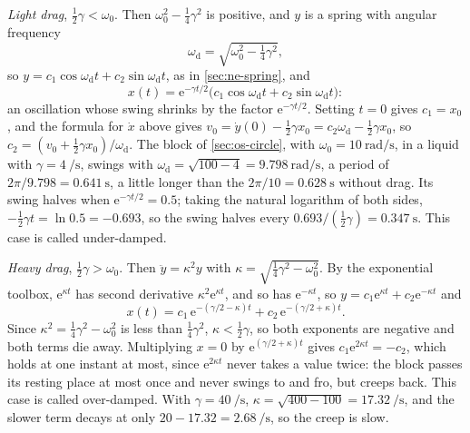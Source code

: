 \emph{Light drag}, $\frac12\gamma < \omega_0$. Then $\omega_0^2 -
\frac14\gamma^2$ is positive, and $y$ is a spring with angular frequency
\begin{equation*}
   \omega_{\mathrm d} = \sqrt{\omega_0^2 - \tfrac14\gamma^2} ,
\end{equation*}
so $y = c_1\cos\omega_{\mathrm d}t + c_2\sin\omega_{\mathrm d}t$, as in
\cref{sec:ne-spring}, and
\begin{equation*}
   x(t) = \mathrm{e}^{-\gamma t/2}\bigl(c_1\cos\omega_{\mathrm d}t
   + c_2\sin\omega_{\mathrm d}t\bigr) :
\end{equation*}
an oscillation whose swing shrinks by the factor $\mathrm{e}^{-\gamma
t/2}$. Setting $t = 0$ gives $c_1 = x_0$, and the formula for $\dot{x}$
above gives $v_0 = \dot{y}(0) - \frac12\gamma x_0 = c_2\omega_{\mathrm d} -
\frac12\gamma x_0$, so $c_2 = (v_0 + \frac12\gamma x_0)/\omega_{\mathrm d}$.
The block of \cref{sec:os-circle}, with $\omega_0 =
\SI{10}{\radian\per\second}$, in a liquid with $\gamma =
\SI{4}{\per\second}$, swings with $\omega_{\mathrm d} = \sqrt{100 - 4} =
\SI{9.798}{\radian\per\second}$, a period of $2\pi/9.798 =
\SI{0.641}{\second}$, a little longer than the $2\pi/10 =
\SI{0.628}{\second}$ without drag. Its swing halves when $\mathrm{e}^{
-\gamma t/2} = 0.5$; taking the natural logarithm of both sides,
$-\frac12\gamma t = \ln 0.5 = -0.693$, so the swing halves every
$0.693/(\frac12\gamma) = \SI{0.347}{\second}$. This case is called under-damped.

\emph{Heavy drag}, $\frac12\gamma > \omega_0$. Then $\ddot{y} = \kappa^2
y$ with $\kappa = \sqrt{\frac14\gamma^2 - \omega_0^2}$. By the exponential
toolbox, $\mathrm{e}^{\kappa t}$ has second derivative $\kappa^2\mathrm{e}^{
\kappa t}$, and so has $\mathrm{e}^{-\kappa t}$, so $y = c_1\mathrm{e}^{
\kappa t} + c_2\mathrm{e}^{-\kappa t}$ and
\begin{equation*}
   x(t) = c_1\,\mathrm{e}^{-(\gamma/2 - \kappa)t}
   + c_2\,\mathrm{e}^{-(\gamma/2 + \kappa)t} .
\end{equation*}
Since $\kappa^2 = \frac14\gamma^2 - \omega_0^2$ is less than
$\frac14\gamma^2$, $\kappa < \frac12\gamma$, so both exponents are
negative and both terms die away. Multiplying $x = 0$ by $\mathrm{e}^{
(\gamma/2 + \kappa)t}$ gives $c_1\mathrm{e}^{2\kappa t} = -c_2$, which
holds at one instant at most, since $\mathrm{e}^{2\kappa t}$ never takes a
value twice: the block passes its resting place at most once and never
swings to and fro, but creeps back. This case is called
over-damped. With $\gamma = \SI{40}{\per\second}$, $\kappa = \sqrt{400 -
100} = \SI{17.32}{\per\second}$, and the slower term decays at only
$20 - 17.32 = \SI{2.68}{\per\second}$, so the creep is slow.

